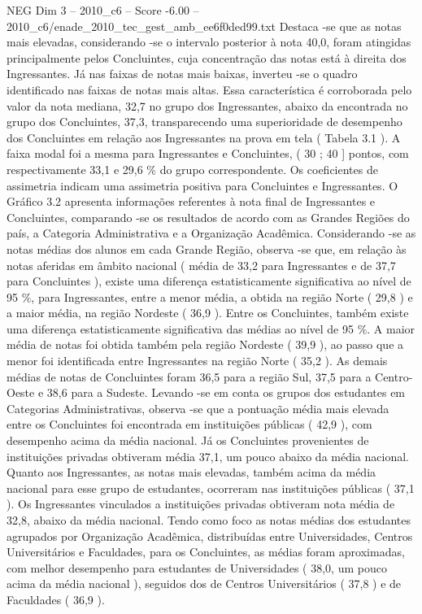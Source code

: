 \begin{textsample}{NEG Dim 3 – 2010\_c6 – Score -6.00 – 2010\_c6/enade\_2010\_tec\_gest\_amb\_ee6f0ded99.txt}
Destaca -se que as notas mais elevadas, considerando -se o intervalo posterior à nota 40,0, foram atingidas principalmente pelos Concluintes, cuja concentração das notas está à direita dos Ingressantes.
Já nas faixas de notas mais baixas, inverteu -se o quadro identificado nas faixas de notas mais altas.
Essa característica é corroborada pelo valor da nota mediana, 32,7 no grupo dos Ingressantes, abaixo da encontrada no grupo dos Concluintes, 37,3, transparecendo uma superioridade de desempenho dos Concluintes em relação aos Ingressantes na prova em tela ( Tabela 3.1 ).
A faixa modal foi a mesma para Ingressantes e Concluintes, ( 30 ; 40 ] pontos, com respectivamente 33,1 e 29,6 \% do grupo correspondente.
Os coeficientes de assimetria indicam uma assimetria positiva para Concluintes e Ingressantes.
O Gráfico 3.2 apresenta informações referentes à nota final de Ingressantes e Concluintes, comparando -se os resultados de acordo com as Grandes Regiões do país, a Categoria Administrativa e a Organização Acadêmica.
Considerando -se as notas médias dos alunos em cada Grande Região, observa -se que, em relação às notas aferidas em âmbito nacional ( média de 33,2 para Ingressantes e de 37,7 para Concluintes ), existe uma diferença estatisticamente significativa ao nível de 95 \%, para Ingressantes, entre a menor média, a obtida na região Norte ( 29,8 ) e a maior média, na região Nordeste ( 36,9 ).
Entre os Concluintes, também existe uma diferença estatisticamente significativa das médias ao nível de 95 \%.
A maior média de notas foi obtida também pela região Nordeste ( 39,9 ), ao passo que a menor foi identificada entre Ingressantes na região Norte ( 35,2 ).
As demais médias de notas de Concluintes foram 36,5 para a região Sul, 37,5 para a Centro-Oeste e 38,6 para a Sudeste.
Levando -se em conta os grupos dos estudantes em Categorias Administrativas, observa -se que a pontuação média mais elevada entre os Concluintes foi encontrada em instituições públicas ( 42,9 ), com desempenho acima da média nacional.
Já os Concluintes provenientes de instituições privadas obtiveram média 37,1, um pouco abaixo da média nacional.
Quanto aos Ingressantes, as notas mais elevadas, também acima da média nacional para esse grupo de estudantes, ocorreram nas instituições públicas ( 37,1 ).
Os Ingressantes vinculados a instituições privadas obtiveram nota média de 32,8, abaixo da média nacional.
Tendo como foco as notas médias dos estudantes agrupados por Organização Acadêmica, distribuídas entre Universidades, Centros Universitários e Faculdades, para os Concluintes, as médias foram aproximadas, com melhor desempenho para estudantes de Universidades ( 38,0, um pouco acima da média nacional ), seguidos dos de Centros Universitários ( 37,8 ) e de Faculdades ( 36,9 ).

\end{textsample}
